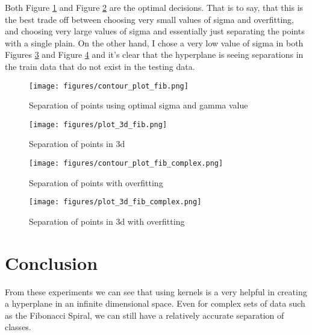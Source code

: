 \documentclass[11pt, twoside]{article}   	%
\begin{document}
Both Figure \ref{fig:sigma_gamma_fib} and Figure \ref{fig:plot_3d_fib} are
the optimal decisions. That is to say, that this is the best trade off
between choosing very small values of sigma and overfitting, and choosing
very large values of sigma and essentially just separating the points with
a single plain. On the other hand, I chose a very low value of sigma in
both Figures \ref{fig:sigma_gamma_fib_overfit} and Figure
\ref{fig:plot_3d_fib_overfit} and it's clear that the hyperplane is seeing
separations in the train data that do not exist in the testing data. 
\begin{figure}[h]
\centering
\texttt{[image: figures/contour\_plot\_fib.png]}
\caption{Separation of points using optimal sigma and gamma value}
\label{fig:sigma_gamma_fib} 
\end{figure}


\begin{figure}[h]
\centering
\texttt{[image: figures/plot\_3d\_fib.png]}
\caption{Separation of points in 3d}
\label{fig:plot_3d_fib} 
\end{figure}

\begin{figure}[h]
\centering
\texttt{[image: figures/contour\_plot\_fib\_complex.png]}
\caption{Separation of points with overfitting}
\label{fig:sigma_gamma_fib_overfit} 
\end{figure}


\begin{figure}[h]
\centering
\texttt{[image: figures/plot\_3d\_fib\_complex.png]}
\caption{Separation of points in 3d with overfitting}
\label{fig:plot_3d_fib_overfit} 
\end{figure}

\section{Conclusion}
From these experiments we can see that using kernels is a very helpful in creating a hyperplane
in an infinite dimensional space. Even for complex sets of data such as the Fibonacci Spiral, 
we can still have a relatively accurate separation of classes. 



\end{document}
